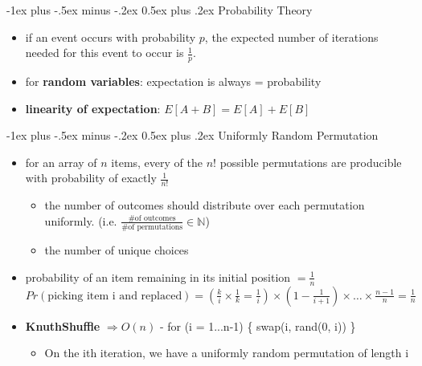 \documentclass[10pt, landscape]{article}
\makeatletter
\renewcommand{\section}{\@startsection{section}{1}{0mm}%
                                {-1ex plus -.5ex minus -.2ex}%
                                {0.5ex plus .2ex}%
                                {\normalfont\large\bfseries}}
\let\Then\Rightarrow
\let\OldItem\item
\newcommand{\SubItemStart}[1]{%
    \let\item\SubItemEnd
    \begin{SubItemList}[resume]%
        \OldItem #1%
}
\newcommand{\SubItemMiddle}[1]{%
    \OldItem #1%
}
\newcommand{\SubItemEnd}[1]{%
    \end{SubItemList}%
    \let\item\OldItem
    \item #1%
}
\newcommand*{\SubItem}[1]{%
    \let\SubItem\SubItemMiddle%
    \SubItemStart{#1}%
}%
\makeatother
\begin{document}
\begin{multicols}{4}
\section{Probability Theory}
\begin{itemize}
    \item if an event occurs with probability $p$, the expected number of iterations needed for this event to occur is $\frac{1}{p}$.
    \item for \textbf{random variables}: expectation is always = probability
    \item \textbf{linearity of expectation}: $E[A + B] = E[A] + E[B]$
\end{itemize}

\section{Uniformly Random Permutation}
\begin{itemize}
    \item for an array of $n$ items, every of the $n!$ possible permutations are producible with probability of exactly $\frac{1}{n!}$
    \begin{itemize}
        \item the number of outcomes should distribute over each permutation uniformly. (i.e. $\frac{\text{\# of outcomes}}{\text{\# of permutations}} \in \mathbb{N}$)
        \item the number of unique choices
    \end{itemize}
    \item probability of an item remaining in its initial position $= \frac{1}{n}$
    \SubItem $Pr(\text{picking item i and replaced}) = (\frac{k}{i} \times \frac{1}{k} = \frac{1}{i}) \times (1 - \frac{1}{i + 1}) \times \dots \times \frac{n - 1}{n} = \frac{1}{n}$
    \item \textbf{KnuthShuffle} $\Then O(n)$ - for (i = 1...n-1) \{ swap(i, rand(0, i)) \}
    \begin{itemize}
        \item On the ith iteration, we have a uniformly random permutation of length i
    \end{itemize} 
\end{itemize}


\end{multicols}
\end{document}

